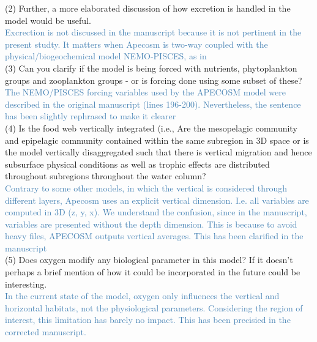 \documentclass[12pt]{article}
\newcommand{\resp}[1]{\textcolor{SteelBlue}{#1}}
\begin{document}

(2) Further, a more elaborated discussion of how excretion is handled in the model would be useful. \\ 

\resp{Excrection is not discussed in the manuscript because it is not pertinent in the present studty. It matters 
when Apecosm is two-way coupled with the physical/biogeochemical model NEMO-PISCES, as in \cite{aumontEvaluatingPotentialImpacts2018, lemezoNaturalVariabilityMarine2016, dupontHighTrophicLevel}} \\


(3) Can you clarify if the model is being forced with nutrients, phytoplankton groups and zooplankton groups - or is forcing done using some subset of these? \\

\resp{The NEMO/PISCES forcing variables used by the APECOSM model were described in the original manuscript (lines  196-200). Nevertheless, the sentence has been slightly rephrased to make it clearer}\\

(4) Is the food web vertically integrated (i.e., Are the mesopelagic community and epipelagic community contained within the same subregion in 3D space or is the model vertically disaggregated such that there is vertical migration and hence subsurface physical conditions as well as trophic effects are distributed throughout subregions throughout the water column? \\ 

\resp{Contrary to some other models, in which the vertical is considered through different layers, Apecosm uses an explicit vertical dimension. I.e. all variables are computed in 3D (z, y, x). We understand the confusion, since in the manuscript, variables are presented without the depth dimension. This is because to avoid heavy files, APECOSM outputs vertical averages. This has been clarified in the manuscript}\\

(5) Does oxygen modify any biological parameter in this model? If it doesn’t perhaps a brief mention of how it could be incorporated in the future could be interesting. \\ 

\resp{In the current state of the model, oxygen only influences the vertical and horizontal habitats, not the physiological parameters. Considering the region of interest, this limitation has barely no impact. This has been precisied in the corrected manuscript.}\\
\end{document}
